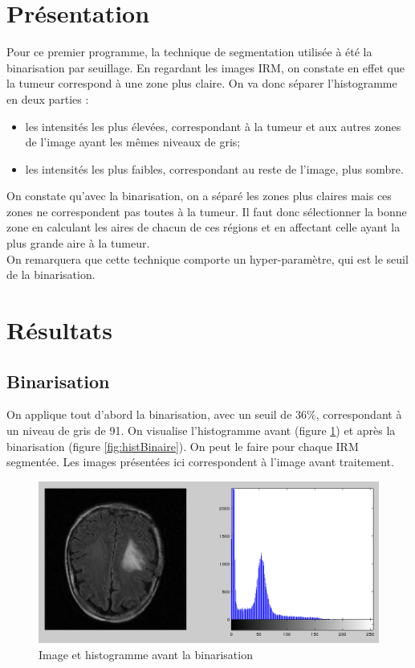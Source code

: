 \section{Présentation} %
\label{sub:pr_sentation}
	Pour ce premier programme, la technique de segmentation utilisée à été la binarisation par seuillage. En regardant les images IRM, on constate en effet que la tumeur correspond à une zone plus claire. On va donc séparer l'histogramme en deux parties :\\
	\begin{itemize}

		\item les intensités les plus élevées, correspondant à la tumeur et aux autres zones de l'image ayant les mêmes niveaux de gris;
		\item les intensités les plus faibles, correspondant au reste de l'image, plus sombre.
	\end{itemize}
	\bigskip

	On constate qu'avec la binarisation, on a séparé les zones plus claires mais ces zones ne correspondent pas toutes à la tumeur. Il faut donc sélectionner la bonne zone en calculant les aires de chacun de ces régions et en affectant celle ayant la plus grande aire à la tumeur.\\

	On remarquera que cette technique comporte un hyper-paramètre, qui est le seuil de la binarisation.


\section{Résultats}
	\subsection{Binarisation} %
	\label{ssub:binarisation}
		On applique tout d'abord la binarisation, avec un seuil de 36\%, correspondant à un niveau de gris de 91. On visualise l'histogramme avant (figure \ref{fig:hist}) et après la binarisation (figure \ref{fig:histBinaire}). On peut le faire pour chaque IRM segmentée. Les images présentées ici correspondent à l'image avant traitement. 

		\begin{figure}[H]
			\centering
			\includegraphics[width=\textwidth]{images/1-hist.png}
			\caption{Image et histogramme avant la binarisation}
			\label{fig:hist}
		\end{figure}

